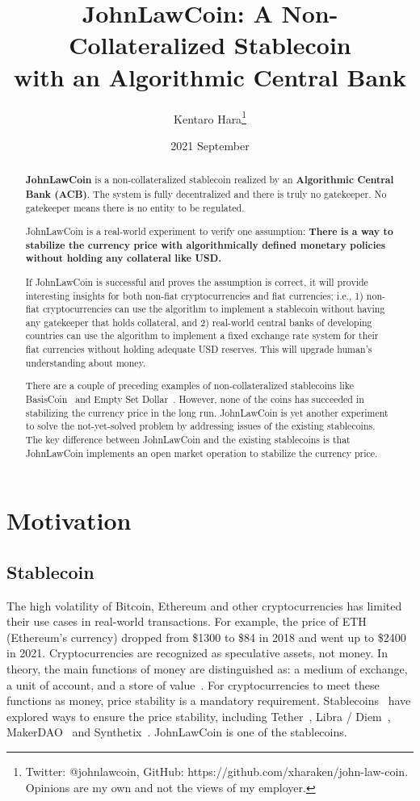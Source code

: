 \documentclass[dvipdfmx,a4paper]{article}
\title{\textbf{JohnLawCoin: A Non-Collateralized Stablecoin\\ with an Algorithmic Central Bank}}
\author{Kentaro Hara\footnote{Twitter: @johnlawcoin, GitHub: https://github.com/xharaken/john-law-coin. Opinions are my own and not the views of my employer.}}
\date{2021 September}
\begin{document}
\maketitle

\begin{abstract}

\textbf{JohnLawCoin} is a non-collateralized stablecoin realized by an \textbf{Algorithmic Central Bank (ACB)}. The system is fully decentralized and there is truly no gatekeeper. No gatekeeper means there is no entity to be regulated.

JohnLawCoin is a real-world experiment to verify one assumption: \textbf{There is a way to stabilize the currency price with algorithmically defined monetary policies without holding any collateral like USD.}

If JohnLawCoin is successful and proves the assumption is correct, it will provide interesting insights for both non-fiat cryptocurrencies and fiat currencies; i.e., 1) non-fiat cryptocurrencies can use the algorithm to implement a stablecoin without having any gatekeeper that holds collateral, and 2) real-world central banks of developing countries can use the algorithm to implement a fixed exchange rate system for their fiat currencies without holding adequate USD reserves. This will upgrade human's understanding about money.

There are a couple of preceding examples of non-collateralized stablecoins like BasisCoin~\cite{basiscoin} and Empty Set Dollar~\cite{emptysetdollar}. However, none of the coins has succeeded in stabilizing the currency price in the long run. JohnLawCoin is yet another experiment to solve the not-yet-solved problem by addressing issues of the existing stablecoins. The key difference between JohnLawCoin and the existing stablecoins is that JohnLawCoin implements an open market operation to stabilize the currency price.

\end{abstract}

\section{Motivation}

\subsection{Stablecoin}

The high volatility of Bitcoin, Ethereum and other cryptocurrencies has limited their use cases in real-world transactions. For example, the price of ETH (Ethereum's currency) dropped from \$1300 to \$84 in 2018 and went up to \$2400 in 2021. Cryptocurrencies are recognized as speculative assets, not money. In theory, the main functions of money are distinguished as: a medium of exchange, a unit of account, and a store of value~\cite{davies2010history,ferguson2008ascent}. For cryptocurrencies to meet these functions as money, price stability is a mandatory requirement. Stablecoins~\cite{moin2020sok,klages2020stablecoins} have explored ways to ensure the price stability, including Tether~\cite{tether}, Libra / Diem~\cite{libra}, MakerDAO~\cite{makerdao} and Synthetix~\cite{synthetix}. JohnLawCoin is one of the stablecoins.
\end{document}
